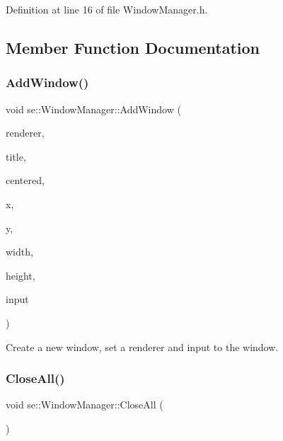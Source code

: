 Definition at line 16 of file Window\+Manager.\+h.



\subsection{Member Function Documentation}
\mbox{\label{classse_1_1_window_manager_a7c5f4786f31a5ffbe12816cc4c1f839a}} 
\subsubsection{\texorpdfstring{Add\+Window()}{AddWindow()}}
{\footnotesize\ttfamily void se\+::\+Window\+Manager\+::\+Add\+Window (\begin{DoxyParamCaption}\item[{\mbox{\hyperlink{classse_1_1_abstract_renderer}{Abstract\+Renderer}} $\ast$}]{renderer,  }\item[{const std\+::string \&}]{title,  }\item[{bool}]{centered,  }\item[{int}]{x,  }\item[{int}]{y,  }\item[{int}]{width,  }\item[{int}]{height,  }\item[{\mbox{\hyperlink{classse_1_1_abstract_input}{Abstract\+Input}} $\ast$}]{input }\end{DoxyParamCaption})}

Create a new window, set a renderer and input to the window. \mbox{\label{classse_1_1_window_manager_ae9106e9a62fa38456da31055f3a663ea}} 
\subsubsection{\texorpdfstring{Close\+All()}{CloseAll()}}
{\footnotesize\ttfamily void se\+::\+Window\+Manager\+::\+Close\+All (\begin{DoxyParamCaption}{ }\end{DoxyParamCaption})}

